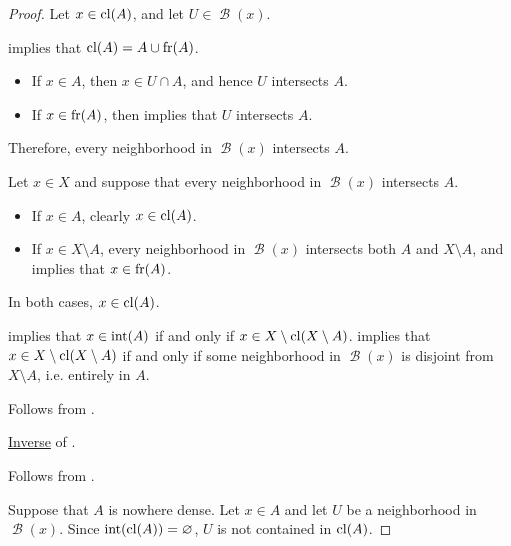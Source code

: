 \begin{proof}
  \SufficiencySubProof* Let \( x \in \operatorname{cl}(A) \), and let \( U \in \mscrB(x) \).

   implies that \( \operatorname{cl}(A) = A \cup \operatorname{fr}(A) \).
  \begin{itemize}
    \item If \( x \in A \), then \( x \in U \cap A \), and hence \( U \) intersects \( A \).
    \item If \( x \in \operatorname{fr}(A) \), then  implies that \( U \) intersects \( A \).
  \end{itemize}

  Therefore, every neighborhood in \( \mscrB(x) \) intersects \( A \).

  \NecessitySubProof* Let \( x \in X \) and suppose that every neighborhood in \( \mscrB(x) \) intersects \( A \).

  \begin{itemize}
    \item If \( x \in A \), clearly \( x \in \operatorname{cl}(A) \).
    \item If \( x \in X \setminus A \), every neighborhood in \( \mscrB(x) \) intersects both \( A \) and \( X \setminus A \), and  implies that \( x \in \operatorname{fr}(A) \).
  \end{itemize}

  In both cases, \( x \in \operatorname{cl}(A) \).

    implies that \( x \in \operatorname{int}(A) \) if and only if \( x \in X \setminus \operatorname{cl}(X \setminus A) \).  implies that \( x \in X \setminus \operatorname{cl}(X \setminus A) \) if and only if some neighborhood in \( \mscrB(x) \) is disjoint from \( X \setminus A \), i.e. entirely in \( A \).

   Follows from .

   \hyperref[def:material_implication/inverse]{Inverse} of .

   Follows from .


  \SufficiencySubProof* Suppose that \( A \) is nowhere dense. Let \( x \in A \) and let \( U \) be a neighborhood in \( \mscrB(x) \). Since \( \operatorname{int}(\operatorname{cl}(A)) = \varnothing \), \( U \) is not contained in \( \operatorname{cl}(A) \).


\end{proof}
